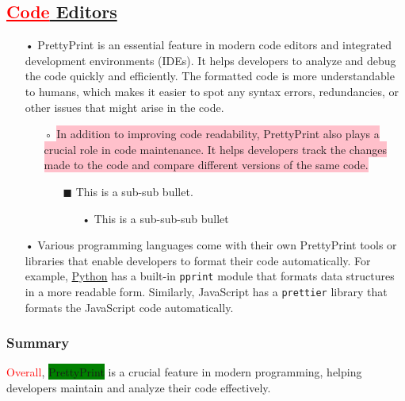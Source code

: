 \documentclass[12pt, a4paper]{article}
\begin{document}
\subsection{\textcolor{red}{\underline{Code}}\underline{ Editors}}
\begin{itemize}
\item[•] PrettyPrint is an essential feature in modern code editors and integrated development environments (IDEs). It helps developers to analyze and debug the code quickly and efficiently. The formatted code is more understandable to humans, which makes it easier to spot any syntax errors, redundancies, or other issues that might arise in the code.
\begin{itemize}
\item[◦] \colorbox{pink}{In addition to improving code readability, PrettyPrint also plays a crucial role in code maintenance. It helps developers track the changes made to the code and compare different versions of the same code.}
\begin{itemize}
\item[$\blacksquare$] This is a sub-sub bullet.
\begin{itemize}
\item[•] This is a sub-sub-sub bullet
\end{itemize}
\end{itemize}
\end{itemize}
\item[•] Various programming languages come with their own PrettyPrint tools or libraries that enable developers to format their code automatically. For example, \href{http://python.org/}{Python} has a built-in \texttt{pprint} module that formats data structures in a more readable form. Similarly, JavaScript has a \texttt{prettier} library that formats the JavaScript code automatically.
\end{itemize}
\subsubsection{Summary}
\textcolor{red}{Overall}, \colorbox{green}{PrettyPrint} is a crucial feature in modern programming, helping developers maintain and analyze their code effectively.
\end{document}

